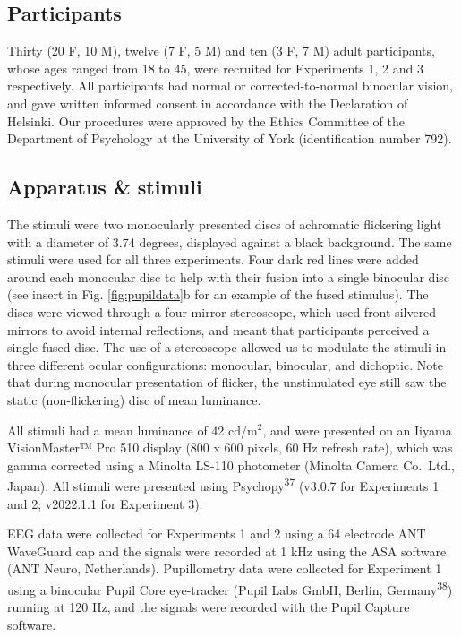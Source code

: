 \documentclass[
]{article}
\begin{document}
\hypertarget{participants}{%
\subsection{Participants}\label{participants}}

Thirty (20 F, 10 M), twelve (7 F, 5 M) and ten (3 F, 7 M) adult participants, whose ages ranged from 18 to 45, were recruited for Experiments 1, 2 and 3 respectively. All participants had normal or corrected-to-normal binocular vision, and gave written informed consent in accordance with the Declaration of Helsinki. Our procedures were approved by the Ethics Committee of the Department of Psychology at the University of York (identification number 792).

\hypertarget{apparatus-stimuli}{%
\subsection{Apparatus \& stimuli}\label{apparatus-stimuli}}

The stimuli were two monocularly presented discs of achromatic flickering light with a diameter of 3.74 degrees, displayed against a black background. The same stimuli were used for all three experiments. Four dark red lines were added around each monocular disc to help with their fusion into a single binocular disc (see insert in Fig. \ref{fig:pupildata}b for an example of the fused stimulus). The discs were viewed through a four-mirror stereoscope, which used front silvered mirrors to avoid internal reflections, and meant that participants perceived a single fused disc. The use of a stereoscope allowed us to modulate the stimuli in three different ocular configurations: monocular, binocular, and dichoptic. Note that during monocular presentation of flicker, the unstimulated eye still saw the static (non-flickering) disc of mean luminance.

All stimuli had a mean luminance of 42 cd/m\(^2\), and were presented on an Iiyama VisionMaster™ Pro 510 display (800 x 600 pixels, 60 Hz refresh rate), which was gamma corrected using a Minolta LS-110 photometer (Minolta Camera Co.~Ltd., Japan). All stimuli were presented using Psychopy\textsuperscript{37} (v3.0.7 for Experiments 1 and 2; v2022.1.1 for Experiment 3).

EEG data were collected for Experiments 1 and 2 using a 64 electrode ANT WaveGuard cap and the signals were recorded at 1 kHz using the ASA software (ANT Neuro, Netherlands). Pupillometry data were collected for Experiment 1 using a binocular Pupil Core eye-tracker (Pupil Labs GmbH, Berlin, Germany\textsuperscript{38}) running at 120 Hz, and the signals were recorded with the Pupil Capture software.
\end{document}
